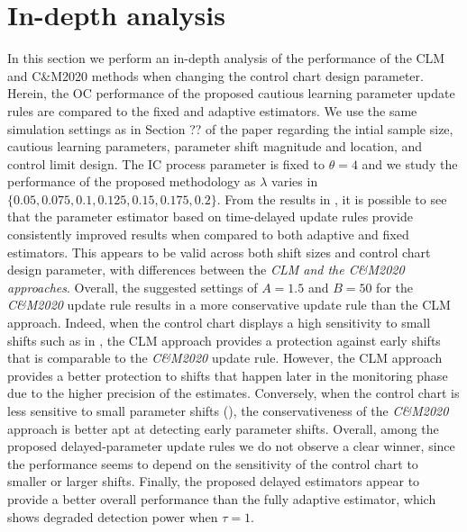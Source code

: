 \section{In-depth analysis}
In this section we perform an in-depth analysis of the performance of the CLM and C&M2020 methods when changing the control chart design parameter.
Herein, the OC performance of the proposed cautious learning parameter update rules are compared to the fixed and adaptive estimators.
We use the same simulation settings as in Section ?? of the paper regarding the intial sample size, cautious learning parameters, parameter shift magnitude and location, and control limit design.
The IC process parameter is fixed to $\theta = 4$ and we study the performance of the proposed methodology as $ \lambda$ varies in $\{0.05, 0.075, 0.1, 0.125, 0.15, 0.175, 0.2\} $.
From the results in , it is possible to see that the parameter estimator based on time-delayed update rules provide consistently improved results when compared to both adaptive and fixed estimators.
This appears to be valid across both shift sizes and control chart design parameter, with differences between the \textit{CLM and the C\&M2020 approaches}.
Overall, the suggested settings of $ A=1.5$ and $ B=50$ for the \textit{C\&M2020} update rule results in a more conservative update rule than the CLM approach.
Indeed, when the control chart displays a high sensitivity to small shifts such as in , the CLM approach provides a protection against early shifts that is comparable to the \textit{C\&M2020} update rule.
However, the CLM approach provides a better protection to shifts that happen later in the monitoring phase due to the higher precision of the estimates.
Conversely, when the control chart is less sensitive to small parameter shifts (), the conservativeness of the \textit{C\&M2020} approach is better apt at detecting early parameter shifts.
Overall, among the proposed delayed-parameter update rules we do not observe a clear winner, since the performance seems to depend on the sensitivity of the control chart to smaller or larger shifts.
Finally, the proposed delayed estimators appear to provide a better overall performance than the fully adaptive estimator, which shows degraded detection power when $ \tau=1$.

